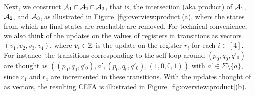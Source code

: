 Next, 
we construct $\mathcal{A}_1 \cap \mathcal{A}_2 \cap \mathcal{A}_3$, that is, the intersection (aka product) of $\mathcal{A}_1$, $\mathcal{A}_2$, and $\mathcal{A}_3$, as illustrated in Figure~\ref{fig:overview:product}(a), where the states from which no final states are reachable are removed. 
For technical convenience, we also think of the updates on the values of registers in transitions as vectors $(v_1, v_2, v_3, v_4)$, where $v_i \in \mathbb{Z}$ is the update on the register $r_{i}$ for each $i \in [4]$. For instance, the transitions corresponding to the self-loop around $(p_0, q_0, q'_0)$ are thought as $((p_0, q_0, q'_0), a', (p_0, q_0, q'_0), (1,0,0,1))$ with $a' \in \Sigma \setminus \{a\}$, since $r_1$ and $r_4$ are incremented in these transitions. With the updates thought of as vectors, the resulting CEFA is illustrated in Figure~\ref{fig:overview:product}(b).

